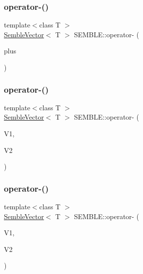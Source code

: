 \mbox{\label{namespaceSEMBLE_acb8d0c10fdb354c4ad2ff7a76fde06da}} 
\subsubsection{\texorpdfstring{operator-\/()}{operator-()}\hspace{0.1cm}{\footnotesize\ttfamily [2/8]}}
{\footnotesize\ttfamily template$<$class T $>$ \\
\mbox{\hyperlink{structSEMBLE_1_1SembleVector}{Semble\+Vector}}$<$ T $>$ S\+E\+M\+B\+L\+E\+::operator-\/ (\begin{DoxyParamCaption}\item[{const \mbox{\hyperlink{structSEMBLE_1_1SembleVector}{Semble\+Vector}}$<$ T $>$ \&}]{plus }\end{DoxyParamCaption})}

\mbox{\label{namespaceSEMBLE_af31d4baafe49e2d53b7ac9a1dac455d9}} 
\subsubsection{\texorpdfstring{operator-\/()}{operator-()}\hspace{0.1cm}{\footnotesize\ttfamily [3/8]}}
{\footnotesize\ttfamily template$<$class T $>$ \\
\mbox{\hyperlink{structSEMBLE_1_1SembleVector}{Semble\+Vector}}$<$ T $>$ S\+E\+M\+B\+L\+E\+::operator-\/ (\begin{DoxyParamCaption}\item[{const \mbox{\hyperlink{structSEMBLE_1_1SembleVector}{Semble\+Vector}}$<$ T $>$ \&}]{V1,  }\item[{const \mbox{\hyperlink{structSEMBLE_1_1SembleVector}{Semble\+Vector}}$<$ T $>$ \&}]{V2 }\end{DoxyParamCaption})}

\mbox{\label{namespaceSEMBLE_a3a4c3290eef6f14585e4ce4f8a2109f5}} 
\subsubsection{\texorpdfstring{operator-\/()}{operator-()}\hspace{0.1cm}{\footnotesize\ttfamily [4/8]}}
{\footnotesize\ttfamily template$<$class T $>$ \\
\mbox{\hyperlink{structSEMBLE_1_1SembleVector}{Semble\+Vector}}$<$ T $>$ S\+E\+M\+B\+L\+E\+::operator-\/ (\begin{DoxyParamCaption}\item[{const \mbox{\hyperlink{structSEMBLE_1_1SembleVector}{Semble\+Vector}}$<$ T $>$ \&}]{V1,  }\item[{const itpp\+::\+Vec$<$ T $>$ \&}]{V2 }\end{DoxyParamCaption})}

